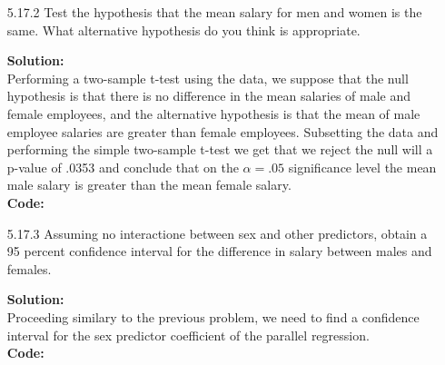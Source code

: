 \documentclass[12pt]{article}
\makeatletter
\theoremstyle{homework}
\newenvironment{exercise}[1]
{\def\@currentlabel{#1}\exercisecore}
{\endexercisecore}
\newcommand{\localhead}[1]{\par\smallskip\noindent\textbf{#1}\nobreak\\}%
\newcommand\solution{\localhead{Solution:}}
\makeatother
\begin{document}
\begin{exercise}{2}
\begin{enumerate}
       \item[5.17.2] Test the hypothesis that the mean salary for men and women is the same. What alternative hypothesis do you 
       think is appropriate.\\
       \solution Performing a two-sample t-test using the data, we suppose that the null hypothesis is that there is no difference in the mean salaries 
       of male and female employees, and the alternative hypothesis is that the mean of male employee salaries are greater than female employees. Subsetting 
       the data and performing the simple two-sample t-test we get that we reject the null will a p-value of .0353 and conclude that on the $\alpha = .05$ significance 
       level the mean male salary is greater than the mean female salary. \\
       \textbf{Code:}
       \begin{center}
       
       \end{center}  
\newpage



       \item[5.17.3] Assuming no interactione between sex and other predictors, obtain a 95 percent confidence interval for the 
       difference in salary between males and females.  \\
       \solution Proceeding similary to the previous problem, we need to find a confidence interval for the sex predictor coefficient of the 
       parallel regression.\\
       \textbf{Code:}
       \begin{center}
       
       \end{center}
   \end{enumerate}
\end{exercise}
\newpage
\end{document}
